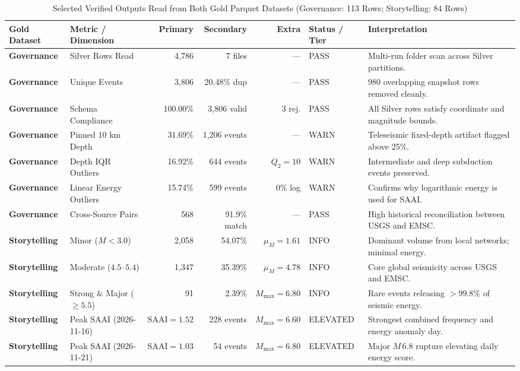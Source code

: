 \begin{table}[!t]
\centering
\caption{Selected Verified Outputs Read from Both Gold Parquet Datasets (Governance: 113 Rows; Storytelling: 84 Rows)}
\label{tab:gold_results}
\scriptsize
\renewcommand{\arraystretch}{1.05}
\begin{tabularx}{\textwidth}{p{2.0cm} p{2.9cm} r r r l X}
\toprule
\textbf{Gold Dataset} & \textbf{Metric / Dimension} & \textbf{Primary} & \textbf{Secondary} & \textbf{Extra} & \textbf{Status / Tier} & \textbf{Interpretation} \\
\midrule
\textbf{Governance} & Silver Rows Read & 4,786 & 7 files & --- & PASS & Multi-run folder scan across Silver partitions. \\
\textbf{Governance} & Unique Events & 3,806 & 20.48\% dup & --- & PASS & 980 overlapping snapshot rows removed cleanly. \\
\textbf{Governance} & Schema Compliance & 100.00\% & 3,806 valid & 3 rej. & PASS & All Silver rows satisfy coordinate and magnitude bounds. \\
\textbf{Governance} & Pinned 10 km Depth & 31.69\% & 1,206 events & --- & WARN & Teleseismic fixed-depth artifact flagged above 25\%. \\
\textbf{Governance} & Depth IQR Outliers & 16.92\% & 644 events & $Q_2=10$ & WARN & Intermediate and deep subduction events preserved. \\
\textbf{Governance} & Linear Energy Outliers & 15.74\% & 599 events & 0\% log & WARN & Confirms why logarithmic energy is used for SAAI. \\
\textbf{Governance} & Cross-Source Pairs & 568 & 91.9\% match & --- & PASS & High historical reconciliation between USGS and EMSC. \\
\midrule
\textbf{Storytelling} & Minor ($M < 3.0$) & 2,058 & 54.07\% & $\mu_M=1.61$ & INFO & Dominant volume from local networks; minimal energy. \\
\textbf{Storytelling} & Moderate ($4.5\text{--}5.4$) & 1,347 & 35.39\% & $\mu_M=4.78$ & INFO & Core global seismicity across USGS and EMSC. \\
\textbf{Storytelling} & Strong \& Major ($\ge 5.5$) & 91 & 2.39\% & $M_{\max}=6.80$ & INFO & Rare events releasing $>99.8\%$ of seismic energy. \\
\textbf{Storytelling} & Peak SAAI (2026-11-16) & $\text{SAAI}=1.52$ & 228 events & $M_{\max}=6.60$ & ELEVATED & Strongest combined frequency and energy anomaly day. \\
\textbf{Storytelling} & Peak SAAI (2026-11-21) & $\text{SAAI}=1.03$ & 54 events & $M_{\max}=6.80$ & ELEVATED & Major $M\,6.8$ rupture elevating daily energy score. \\

\end{tabularx}
\end{table}
